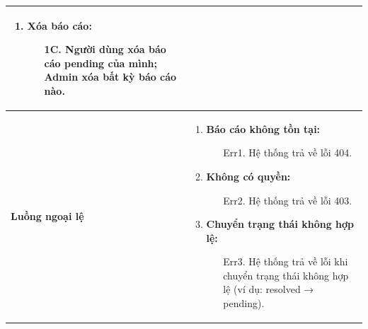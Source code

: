 {\begin{tabularx}{\textwidth}{|>{\raggedright\arraybackslash}X|>{\raggedright\arraybackslash}X|}
\begin{enumerate}
\begin{enumerate}
    \end{enumerate}
    \item \textbf{Xóa báo cáo:}
    \begin{enumerate}
        \item[1C.] Người dùng xóa báo cáo pending của mình; Admin xóa bất kỳ báo cáo nào.
    \end{enumerate}
\end{enumerate} \\
\hline
\textbf{Luồng ngoại lệ} &
\begin{enumerate}
    \item \textbf{Báo cáo không tồn tại:}
    \begin{enumerate}
        \item[Err1.] Hệ thống trả về lỗi 404.
    \end{enumerate}
    \item \textbf{Không có quyền:}
    \begin{enumerate}
        \item[Err2.] Hệ thống trả về lỗi 403.
    \end{enumerate}
    \item \textbf{Chuyển trạng thái không hợp lệ:}
    \begin{enumerate}
        \item[Err3.] Hệ thống trả về lỗi khi chuyển trạng thái không hợp lệ (ví dụ: resolved → pending).
    \end{enumerate}
\end{enumerate} \\
\hline
\end{tabularx}
}

